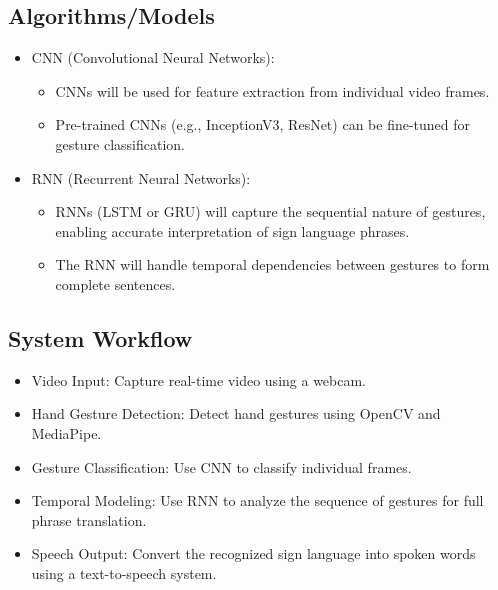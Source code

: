 \documentclass{article}
\begin{document}
\subsection*{Algorithms/Models} 
\begin{itemize}
    \item CNN (Convolutional Neural Networks):
        \begin{itemize}
            \item CNNs will be used for feature extraction from individual video frames.
            \item Pre-trained CNNs (e.g., InceptionV3, ResNet) can be fine-tuned for gesture classification.
        \end{itemize}
    \item RNN (Recurrent Neural Networks):
        \begin{itemize}
            \item RNNs (LSTM or GRU) will capture the sequential nature of gestures, enabling accurate interpretation of sign language phrases.
            \item The RNN will handle temporal dependencies between gestures to form complete sentences.
        \end{itemize}
\end{itemize}

\subsection*{System Workflow}
\begin{itemize}
    \item Video Input: Capture real-time video using a webcam.
    \item Hand Gesture Detection: Detect hand gestures using OpenCV and MediaPipe.
    \item Gesture Classification: Use CNN to classify individual frames.
    \item Temporal Modeling: Use RNN to analyze the sequence of gestures for full phrase translation.
    \item Speech Output: Convert the recognized sign language into spoken words using a text-to-speech system.
\end{itemize}
\end{document}
